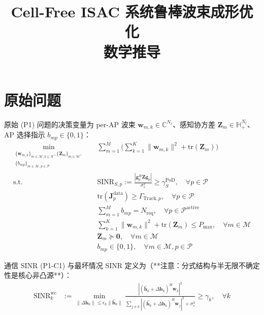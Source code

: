 \documentclass[12pt,a4paper]{article}
\title{\textbf{Cell-Free ISAC 系统鲁棒波束成形优化\\数学推导}}
\author{}
\date{}
\newcommand{\vect}[1]{\mathbf{#1}}
\newcommand{\mat}[1]{\mathbf{#1}}
\newcommand{\tr}{\text{tr}}
\begin{document}
\maketitle

\section{原始问题}\label{sec:p1}

原始 (P1) 问题的决策变量为 per-AP 波束 $\vect{w}_{m,k} \in \mathbb{C}^{N_t}$、感知协方差 $\mat{Z}_m \in \mathbb{H}_+^{N_t}$、AP 选择指示 $b_{mp} \in \{0,1\}$：
\begin{align}
\min_{\substack{\{\vect{w}_{m,k}\}_{m \in \mathcal{M}, k \in \mathcal{K}}, \{\mat{Z}_m\}_{m \in \mathcal{M}}, \\ \{b_{mp}\}_{m \in \mathcal{M}, p \in \mathcal{P}}}} \quad 
& \sum_{m=1}^{M} \Big( \sum_{k=1}^{K} \|\vect{w}_{m,k}\|^2 + \tr(\mat{Z}_m) \Big) \tag{P1-objective} \\
\text{s.t.} \quad 
& \text{SINR}_{S,p} := \frac{|\vect{g}_p^H \mat{Z} \vect{g}_p|}{\sigma_s^2} \geq \gamma_S^{\text{PoD}}, \quad \forall p \in \mathcal{P} \tag{P1-C2} \\
& \tr(\mat{J}_p^{\text{data}}) \geq \Gamma_{\text{Track}, p}, \quad \forall p \in \mathcal{P} \tag{P1-C3} \\
& \sum_{m=1}^{M} b_{mp} = N_{\text{req}}, \quad \forall p \in \mathcal{P}^{\text{active}} \tag{P1-C4} \\
& \sum_{k=1}^{K} \|\vect{w}_{m,k}\|^2 + \tr(\mat{Z}_m) \leq P_{\max}, \quad \forall m \in \mathcal{M} \tag{P1-C5} \\
& \mat{Z}_m \succeq \mat{0}, \quad \forall m \in \mathcal{M} \tag{P1-C6} \\
& b_{mp} \in \{0, 1\}, \quad \forall m \in \mathcal{M}, p \in \mathcal{P} \tag{P1-C7}
\end{align}

通信 SINR (P1-C1) 与最坏情况 SINR 定义为（**注意：分式结构与半无限不确定性是核心非凸源**）：
\begin{align}
\tag{P1-C1} \text{SINR}_k^{\text{wc}} &:= \min_{\|\Delta\vect{h}_k\| \leq \epsilon_h \|\hat{\vect{h}}_k\|} \frac{|(\hat{\vect{h}}_k + \Delta\vect{h}_k)^H \vect{w}_k|^2}{\sum_{j \neq k} |(\hat{\vect{h}}_k + \Delta\vect{h}_k)^H \vect{w}_j|^2 + \sigma_c^2} \geq \gamma_k, \quad \forall k
\end{align}
\end{document}
